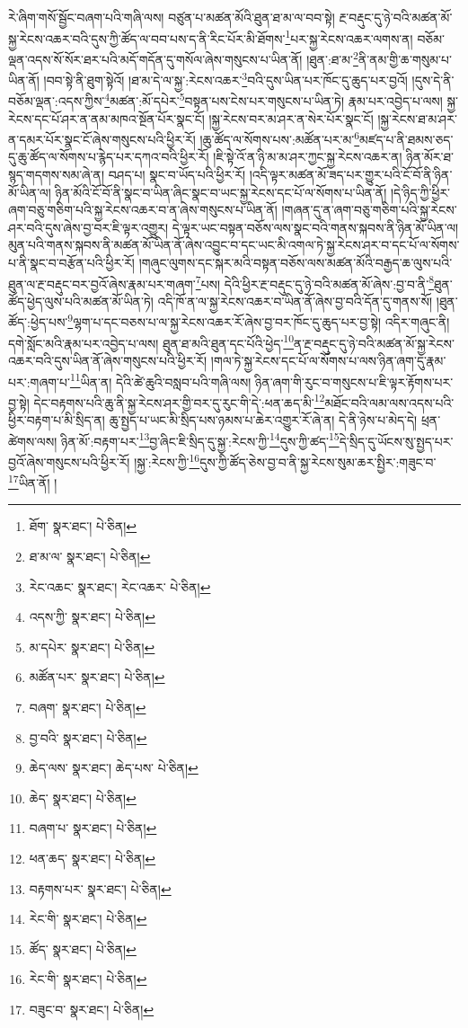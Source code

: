 རེ་ཞིག་གསོ་སྦྱོང་བཞག་པའི་གཞི་ལས། བཙུན་པ་མཚན་མོའི་ཐུན་ཐ་མ་ལ་བབ་སྟེ། རྔ་བརྡུང་དུ་ཉེ་བའི་མཚན་མོ་སྐྱ་རེངས་འཆར་བའི་དུས་ཀྱི་ཚོད་ལ་བབ་པས་ད་ནི་རིང་པོར་མི་ཐོགས་\footnote{ཐོག་  སྣར་ཐང་།  པེ་ཅིན། }པར་སྐྱ་རེངས་འཆར་ལགས་ན། བཅོམ་ལྡན་འདས་སོ་སོར་ཐར་པའི་མདོ་གདོན་དུ་གསོལ་ཞེས་གསུངས་པ་ཡིན་ནོ། །ཐུན་:ཐ་མ་\footnote{ཐ་མ་ལ་  སྣར་ཐང་།  པེ་ཅིན། }ནི་ནམ་གྱི་ཆ་གསུམ་པ་ཡིན་ནོ། །བབ་སྟེ་ནི་ཐུག་སྟེའོ། །ཐ་མ་དེ་ལ་སྐྱ་:རེངས་འཆར་\footnote{རེང་འཆང་  སྣར་ཐང་། རེང་འཆར་  པེ་ཅིན། }བའི་དུས་ཡིན་པར་ཁོང་དུ་ཆུད་པར་བྱའོ། །དུས་དེ་ནི་བཅོམ་ལྡན་:འདས་ཀྱིས་\footnote{འདས་ཀྱི་  སྣར་ཐང་།  པེ་ཅིན། }མཚན་:མོ་དཔེར་\footnote{མ་དཔེར་  སྣར་ཐང་།  པེ་ཅིན། }བསྟན་པས་ངེས་པར་གསུངས་པ་ཡིན་ཏེ། རྣམ་པར་འབྱེད་པ་ལས། སྐྱ་རེངས་དང་པོ་ཤར་ན་ནམ་མཁའ་སྔོན་པོར་སྣང་ངོ། །སྐྱ་རེངས་བར་མ་ཤར་ན་སེར་པོར་སྣང་ངོ། །སྐྱ་རེངས་ཐ་མ་ཤར་ན་དམར་པོར་སྣང་ངོ་ཞེས་གསུངས་པའི་ཕྱིར་རོ། །ཆུ་ཚོད་ལ་སོགས་པས་:མཚོན་པར་མ་\footnote{མཚོན་པར་  སྣར་ཐང་།  པེ་ཅིན། }མཛད་པ་ནི་ཐམས་ཅད་དུ་ཆུ་ཚོད་ལ་སོགས་པ་རྙེད་པར་དཀའ་བའི་ཕྱིར་རོ། །ཇི་སྟེ་འོ་ན་ཉི་མ་མ་ཤར་ཀྱང་སྐྱ་རེངས་འཆར་ན། ཉིན་མོར་ཐ་སྙད་གདགས་སམ་ཞེ་ན། བཤད་པ། སྣང་བ་ཡོད་པའི་ཕྱིར་རོ། །འདི་ལྟར་མཚན་མོ་ཟད་པར་གྱུར་པའི་ངོ་བོ་ནི་ཉིན་མོ་ཡིན་ལ། ཉིན་མོའི་ངོ་བོ་ནི་སྣང་བ་ཡིན་ཞིང་སྣང་བ་ཡང་སྐྱ་རེངས་དང་པོ་ལ་སོགས་པ་ཡིན་ནོ། །དེ་ཉིད་ཀྱི་ཕྱིར་ཞག་བཅུ་གཅིག་པའི་སྐྱ་རེངས་འཆར་བ་ན་ཞེས་གསུངས་པ་ཡིན་ནོ། །གཞན་དུ་ན་ཞག་བཅུ་གཅིག་པའི་སྐྱ་རེངས་ཤར་བའི་དུས་ཞེས་བྱ་བར་ཇི་ལྟར་འགྱུར། དེ་ལྟར་ཡང་བསྟན་བཅོས་ལས་སྣང་བའི་གནས་སྐབས་ནི་ཉིན་མོ་ཡིན་ལ། མུན་པའི་གནས་སྐབས་ནི་མཚན་མོ་ཡིན་ནོ་ཞེས་འབྱུང་བ་དང་ཡང་མི་འགལ་ཏེ་སྐྱ་རེངས་ཤར་བ་དང་པོ་ལ་སོགས་པ་ནི་སྣང་བ་བརྩོན་པའི་ཕྱིར་རོ། །གཞུང་ལུགས་དང་སྐར་མའི་བསྟན་བཅོས་ལས་མཚན་མོའི་བརྒྱད་ཆ་ལུས་པའི་ཐུན་ལ་རྔ་བརྡུང་བར་བྱའོ་ཞེས་རྣམ་པར་གཞག་\footnote{བཞག་  སྣར་ཐང་།  པེ་ཅིན། }པས། དེའི་ཕྱིར་རྔ་བརྡུང་དུ་ཉེ་བའི་མཚན་མོ་ཞེས་:བྱ་བ་ནི་\footnote{བྱ་བའི་  སྣར་ཐང་།  པེ་ཅིན། }ཐུན་ཚོད་ཕྱེད་ལུས་པའི་མཚན་མོ་ཡིན་ཏེ། འདི་ཁོ་ན་ལ་སྐྱ་རེངས་འཆར་བ་ཡིན་ནོ་ཞེས་བྱ་བའི་དོན་དུ་གནས་སོ། །ཐུན་ཚོད་:ཕྱེད་པས་\footnote{ཆེད་ལས་  སྣར་ཐང་། ཆེད་པས་  པེ་ཅིན། }ལྷག་པ་དང་བཅས་པ་ལ་སྐྱ་རེངས་འཆར་རོ་ཞེས་བྱ་བར་ཁོང་དུ་ཆུད་པར་བྱ་སྟེ། འདིར་གཞུང་ནི། དགེ་སློང་མའི་རྣམ་པར་འབྱེད་པ་ལས། ཐུན་ཐ་མའི་ཐུན་དང་པོའི་ཕྱེད་\footnote{ཆེད་  སྣར་ཐང་།  པེ་ཅིན། }ན་རྔ་བརྡུང་དུ་ཉེ་བའི་མཚན་མོ་སྐྱ་རེངས་འཆར་བའི་དུས་ཡིན་ནོ་ཞེས་གསུངས་པའི་ཕྱིར་རོ། །གལ་ཏེ་སྐྱ་རེངས་དང་པོ་ལ་སོགས་པ་ལས་ཉིན་ཞག་དུ་རྣམ་པར་:གཞག་པ་\footnote{བཞག་པ་  སྣར་ཐང་།  པེ་ཅིན། }ཡིན་ན། དེའི་ཚེ་ཆུའི་བསླབ་པའི་གཞི་ལས། ཉིན་ཞག་གི་རུང་བ་གསུངས་པ་ཇི་ལྟར་རྟོགས་པར་བྱ་སྟེ། དེང་བརྟགས་པའི་ཆུ་ནི་སྐྱ་རེངས་ཤར་གྱི་བར་དུ་རུང་གི་དེ་:ཕན་ཆད་མི་\footnote{ཕན་ཆད་  སྣར་ཐང་།  པེ་ཅིན། }མཐོང་བའི་ལམ་ལས་འདས་པའི་ཕྱིར་བརྟག་པ་མི་སྲིད་ན། ཆུ་སྤྱད་པ་ཡང་མི་སྲིད་པས་ཉམས་པ་ཆེར་འགྱུར་རོ་ཞེ་ན། དེ་ནི་ཉེས་པ་མེད་དེ། ཕྲན་ཚེགས་ལས། ཉིན་མོ་:བརྟག་པར་\footnote{བརྟགས་པར་  སྣར་ཐང་།  པེ་ཅིན། }བྱ་ཞིང་ཇི་སྲིད་དུ་སྐྱ་:རེངས་ཀྱི་\footnote{རེང་གི་  སྣར་ཐང་།  པེ་ཅིན། }དུས་ཀྱི་ཚད་\footnote{ཚོད་  སྣར་ཐང་།  པེ་ཅིན། }དེ་སྲིད་དུ་ཡོངས་སུ་སྤྱད་པར་བྱའོ་ཞེས་གསུངས་པའི་ཕྱིར་རོ། །སྐྱ་:རེངས་ཀྱི་\footnote{རེང་གི་  སྣར་ཐང་།  པེ་ཅིན། }དུས་ཀྱི་ཚོད་ཅེས་བྱ་བ་ནི་སྐྱ་རེངས་སུམ་ཆར་སྤྱིར་:གཟུང་བ་\footnote{བཟུང་བ་  སྣར་ཐང་།  པེ་ཅིན། }ཡིན་ནོ། །
